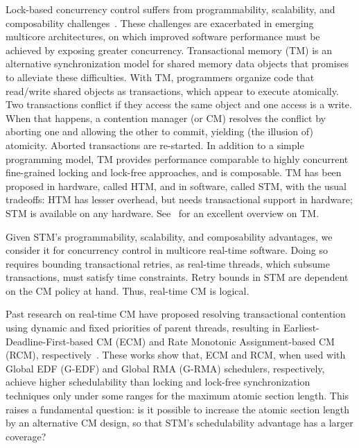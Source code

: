 \documentclass[conference]{sig-alternate}
\begin{document}
Lock-based concurrency control suffers from programmability, scalability, and composability challenges~\cite{Herlihy:2006:AMP:1146381.1146382}. These challenges are exacerbated in emerging multicore architectures, on which improved software performance must be achieved by exposing greater concurrency.  Transactional memory (TM) is an alternative synchronization model for shared memory data objects that promises to alleviate these difficulties.  With TM, programmers organize code that read/write shared objects as transactions, which appear to execute atomically. Two transactions conflict if they access the same object and one access is a write. When that happens, a contention manager (or CM)
resolves the conflict by aborting one and allowing the other to commit, yielding (the illusion of) atomicity. Aborted transactions are re-started.
In addition to a simple programming model, TM provides performance comparable to highly concurrent fine-grained locking and lock-free approaches,  
and is composable. 
TM has been proposed in hardware, called HTM,  
and in software, called STM,  
with the usual tradeoffs: HTM has lesser overhead, but needs transactional support in hardware; STM is available on any hardware. See~\cite{tm-book10} for an excellent overview on TM.


Given STM's programmability, scalability, and composability advantages, we consider it for concurrency control in multicore real-time software. Doing so requires bounding transactional  retries, as real-time threads, which subsume transactions, must satisfy time constraints.  Retry bounds in STM are dependent on the CM policy at hand. Thus, real-time CM is logical.

Past research on real-time CM have proposed resolving transactional contention using dynamic and fixed priorities of parent threads, resulting in Earliest-Deadline-First-based CM (ECM) and Rate Monotonic Assignment-based CM (RCM), respectively~\cite{fahmy2009bounding,fahmy2009response,stmconcurrencycontrol:emsoft11}.
These works show that, ECM and RCM, when used with Global EDF (G-EDF) and Global RMA  (G-RMA) schedulers, respectively, achieve higher schedulability than locking and lock-free synchronization techniques only under some ranges for the maximum atomic section length. This raises a fundamental question: is it possible to increase the atomic section length by an alternative CM design, so that STM's schedulability advantage has a larger coverage? 
\end{document}
